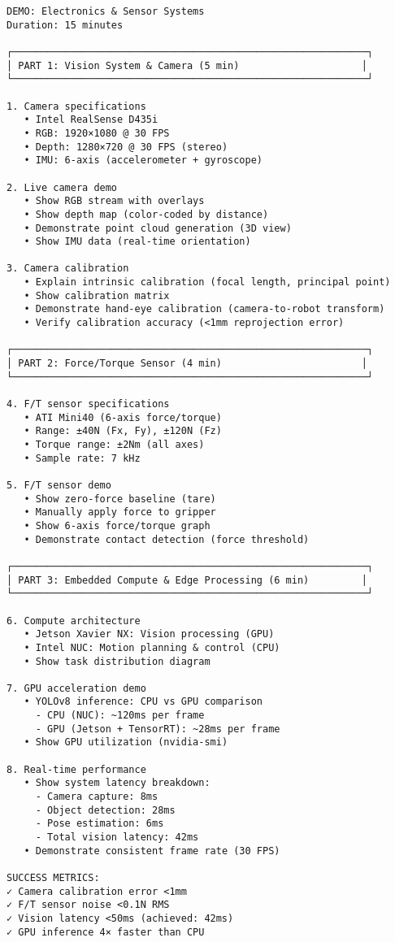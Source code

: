 \documentclass[
]{article}
\begin{document}
\begin{verbatim}
DEMO: Electronics & Sensor Systems
Duration: 15 minutes

┌─────────────────────────────────────────────────────────────┐
│ PART 1: Vision System & Camera (5 min)                     │
└─────────────────────────────────────────────────────────────┘

1. Camera specifications
   • Intel RealSense D435i
   • RGB: 1920×1080 @ 30 FPS
   • Depth: 1280×720 @ 30 FPS (stereo)
   • IMU: 6-axis (accelerometer + gyroscope)

2. Live camera demo
   • Show RGB stream with overlays
   • Show depth map (color-coded by distance)
   • Demonstrate point cloud generation (3D view)
   • Show IMU data (real-time orientation)

3. Camera calibration
   • Explain intrinsic calibration (focal length, principal point)
   • Show calibration matrix
   • Demonstrate hand-eye calibration (camera-to-robot transform)
   • Verify calibration accuracy (<1mm reprojection error)

┌─────────────────────────────────────────────────────────────┐
│ PART 2: Force/Torque Sensor (4 min)                        │
└─────────────────────────────────────────────────────────────┘

4. F/T sensor specifications
   • ATI Mini40 (6-axis force/torque)
   • Range: ±40N (Fx, Fy), ±120N (Fz)
   • Torque range: ±2Nm (all axes)
   • Sample rate: 7 kHz

5. F/T sensor demo
   • Show zero-force baseline (tare)
   • Manually apply force to gripper
   • Show 6-axis force/torque graph
   • Demonstrate contact detection (force threshold)

┌─────────────────────────────────────────────────────────────┐
│ PART 3: Embedded Compute & Edge Processing (6 min)         │
└─────────────────────────────────────────────────────────────┘

6. Compute architecture
   • Jetson Xavier NX: Vision processing (GPU)
   • Intel NUC: Motion planning & control (CPU)
   • Show task distribution diagram

7. GPU acceleration demo
   • YOLOv8 inference: CPU vs GPU comparison
     - CPU (NUC): ~120ms per frame
     - GPU (Jetson + TensorRT): ~28ms per frame
   • Show GPU utilization (nvidia-smi)

8. Real-time performance
   • Show system latency breakdown:
     - Camera capture: 8ms
     - Object detection: 28ms
     - Pose estimation: 6ms
     - Total vision latency: 42ms
   • Demonstrate consistent frame rate (30 FPS)

SUCCESS METRICS:
✓ Camera calibration error <1mm
✓ F/T sensor noise <0.1N RMS
✓ Vision latency <50ms (achieved: 42ms)
✓ GPU inference 4× faster than CPU
\end{verbatim}
\end{document}

